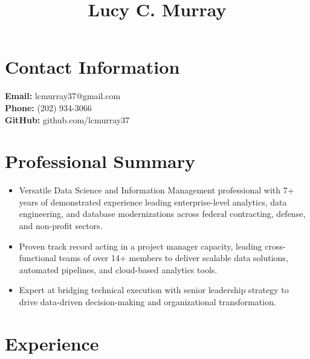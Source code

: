 \documentclass{article}%
\title{Lucy C. Murray}%
\date{}%
\begin{document}
%
\normalsize%
\maketitle%
\section{Contact Information}%
\label{sec:ContactInformation}%
\textbf{Email: } lcmurray37@gmail.com\\%
\textbf{Phone: } (202) 934-3066\\%
\textbf{GitHub: } github.com/lcmurray37\\

%
\section{Professional Summary}%
\label{sec:ProfessionalSummary}%
\begin{itemize}%
\item Versatile Data Science and Information Management professional with 7+ years of demonstrated experience leading enterprise-level analytics, data engineering, and database modernizations across federal contracting, defense, and non-profit sectors.%
\item Proven track record acting in a project manager capacity, leading cross-functional teams of over 14+ members to deliver scalable data solutions, automated pipelines, and cloud-based analytics tools.%
\item Expert at bridging technical execution with senior leadership strategy to drive data-driven decision-making and organizational transformation.%
\end{itemize}

%
\section{Experience}%
\label{sec:Experience}%
\end{document}
